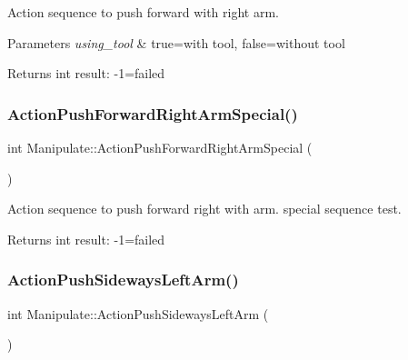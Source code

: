 Action sequence to push forward with right arm. 


\begin{DoxyParams}{Parameters}
{\em using\+\_\+tool} & true=with tool, false=without tool \\
\hline
\end{DoxyParams}
\begin{DoxyReturn}{Returns}
int result\+: -\/1=failed 
\end{DoxyReturn}
\mbox{\label{structManipulate_ac49e6b0ca61223d49110e1dbf02f086e}} 
\subsubsection{\texorpdfstring{Action\+Push\+Forward\+Right\+Arm\+Special()}{ActionPushForwardRightArmSpecial()}}
{\footnotesize\ttfamily int Manipulate\+::\+Action\+Push\+Forward\+Right\+Arm\+Special (\begin{DoxyParamCaption}{ }\end{DoxyParamCaption})\hspace{0.3cm}{\ttfamily [private]}}



Action sequence to push forward right with arm. special sequence test. 

\begin{DoxyReturn}{Returns}
int result\+: -\/1=failed 
\end{DoxyReturn}
\mbox{\label{structManipulate_a0bec14a9892d05383bf8df05ce2c5890}} 
\subsubsection{\texorpdfstring{Action\+Push\+Sideways\+Left\+Arm()}{ActionPushSidewaysLeftArm()}}
{\footnotesize\ttfamily int Manipulate\+::\+Action\+Push\+Sideways\+Left\+Arm (\begin{DoxyParamCaption}{ }\end{DoxyParamCaption})\hspace{0.3cm}{\ttfamily [private]}}



